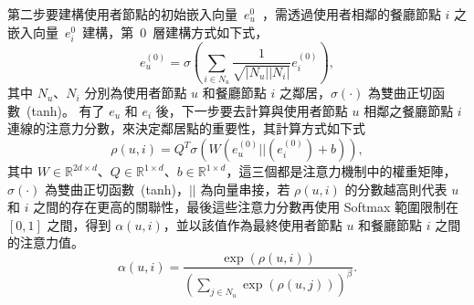 第二步要建構使用者節點的初始嵌入向量~$e_u^{0}$~，需透過使用者相鄰的餐廳節點 $i$ 之嵌入向量~$e_i^{0}$~建構，第~$0$~層建構方式如下式，
\begin{equation}
    e_u^{(0)} = \sigma (\sum_{i \in N_u} \frac{1}{\sqrt{\vert N_u \vert \vert N_i \vert}}e_i^{(0)}),
\end{equation}
其中 $N_u$、$N_i$ 分別為使用者節點 $u$ 和餐廳節點 $i$ 之鄰居，$\sigma(\cdot)$ 為雙曲正切函數~(tanh)。
有了 $e_u$ 和 $e_i$ 後，下一步要去計算與使用者節點 $u$ 相鄰之餐廳節點 $i$ 連線的注意力分數，來決定鄰居點的重要性，其計算方式如下式
\begin{equation}
    \rho(u, i) = Q^T\sigma(W(e_u^{(0)}||(e_i^{(0)})+b)),
\end{equation}
其中 $W \in \mathbb{R}^{2d \times d}$、$Q \in \mathbb{R}^{1 \times d}$、$b \in \mathbb{R}^{1 \times d}$，這三個都是注意力機制中的權重矩陣，$\sigma(\cdot)$ 為雙曲正切函數~(tanh)，$||$ 為向量串接，若 $\rho(u, i)$ 的分數越高則代表 $u$ 和 $i$ 之間的存在更高的關聯性，最後這些注意力分數再使用 Softmax 範圍限制在 $[0,1]$ 之間，得到 $\alpha(u, i)$，並以該值作為最終使用者節點 $u$ 和餐廳節點 $i$ 之間的注意力值。
\begin{equation}
    \alpha(u, i) = \frac{\exp(\rho(u, i))}{(\sum_{j \in N_u}\exp(\rho(u, j)))^{\beta}}.
\end{equation}
\color{black}